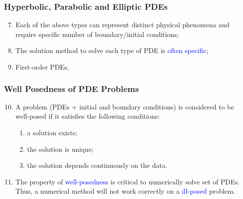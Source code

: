 \documentclass[10pt,compress]{beamer}
\begin{document}
\begin{frame}
 \frametitle{Hyperbolic, Parabolic and Elliptic PDEs} 
 \begin{enumerate}
   \setcounter{enumi}{6}
   \item <1-> Each of the above types can represent distinct physical phenomena and require specific number of boundary/initial conditions;
   \item <2->The solution method to solve each type of PDE is \textcolor{blue}{often specific};
   \item <3-> First-order PDEs,

 \end{enumerate}   
 
\end{frame}


\begin{frame}
 \frametitle{Well Posedness of PDE Problems} 
 \begin{enumerate}
   \setcounter{enumi}{9}
   \item <1-> A problem (PDEs + initial and boundary conditions) is considered to be well-posed if it satisfies the following conditions:
      \begin{enumerate}
        \item <2-> a solution exists;
        \item <3-> the solution is unique;
        \item <4-> the solution depends continuously on the data.
      \end{enumerate}
    \item <5-> The property of \textcolor{blue}{well-posedness} is critical to numerically solve set of PDEs. Thus, a numerical method will not work correctly on a \textcolor{blue}{ill-posed} problem. 
 \end{enumerate}   
 
\end{frame}
\end{document}
